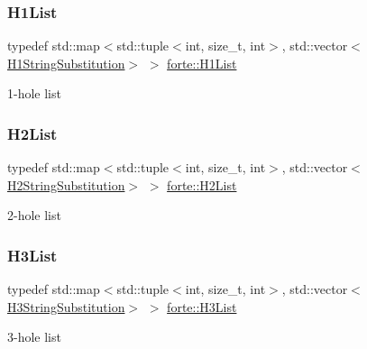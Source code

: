 \mbox{\label{namespaceforte_a963024d9b602794c861da15d743aba5f}} 
\subsubsection{\texorpdfstring{H1\+List}{H1List}}
{\footnotesize\ttfamily typedef std\+::map$<$std\+::tuple$<$int, size\+\_\+t, int$>$, std\+::vector$<$\mbox{\hyperlink{structforte_1_1_h1_string_substitution}{H1\+String\+Substitution}}$>$ $>$ \mbox{\hyperlink{namespaceforte_a963024d9b602794c861da15d743aba5f}{forte\+::\+H1\+List}}}



1-\/hole list 

\mbox{\label{namespaceforte_a27f0055671465d64abd83c86dfcccc5c}} 
\subsubsection{\texorpdfstring{H2\+List}{H2List}}
{\footnotesize\ttfamily typedef std\+::map$<$std\+::tuple$<$int, size\+\_\+t, int$>$, std\+::vector$<$\mbox{\hyperlink{structforte_1_1_h2_string_substitution}{H2\+String\+Substitution}}$>$ $>$ \mbox{\hyperlink{namespaceforte_a27f0055671465d64abd83c86dfcccc5c}{forte\+::\+H2\+List}}}



2-\/hole list 

\mbox{\label{namespaceforte_a14d2a6006ea5c335d7258709b58702cb}} 
\subsubsection{\texorpdfstring{H3\+List}{H3List}}
{\footnotesize\ttfamily typedef std\+::map$<$std\+::tuple$<$int, size\+\_\+t, int$>$, std\+::vector$<$\mbox{\hyperlink{structforte_1_1_h3_string_substitution}{H3\+String\+Substitution}}$>$ $>$ \mbox{\hyperlink{namespaceforte_a14d2a6006ea5c335d7258709b58702cb}{forte\+::\+H3\+List}}}



3-\/hole list 

\mbox{\label{namespaceforte_aba0d18f1ff36b478ecf2db631246e120}} 
